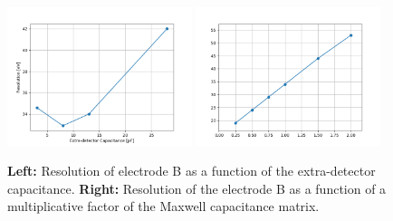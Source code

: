 \begin{figure}
\centering
\includegraphics[width=0.48\textwidth]{Figures/Electrodes/scan_capacitance.png}
\includegraphics[width=0.48\textwidth]{Figures/Electrodes/scan_alpha.png}
\caption{
\textbf{Left:} Resolution of electrode B as a function of the extra-detector capacitance.
\textbf{Right:} Resolution of the electrode B as a function of a multiplicative factor of the Maxwell capacitance matrix.
}
\label{fig:fid38-fiducial}
\end{figure}

